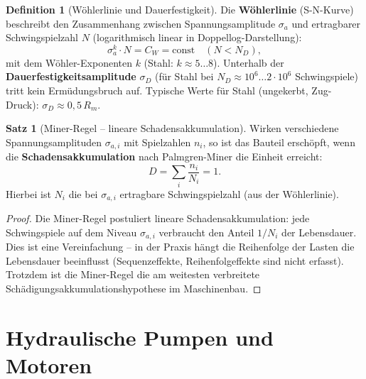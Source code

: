 ﻿\documentclass[a4paper,12pt]{report}
\theoremstyle{definition}
\newtheorem{definition}{Definition}
\newtheorem{satz}{Satz}
\begin{document}
\begin{definition}[Wöhlerlinie und Dauerfestigkeit]
Die \textbf{Wöhlerlinie} (S-N-Kurve) beschreibt den Zusammenhang zwischen
Spannungsamplitude $\sigma_a$ und ertragbarer Schwingspielzahl $N$
(logarithmisch linear in Doppellog-Darstellung):
\[
  \sigma_a^k \cdot N = C_W = \mathrm{const} \quad (N < N_D),
\]
mit dem Wöhler-Exponenten $k$ (Stahl: $k \approx 5\ldots8$).
Unterhalb der \textbf{Dauerfestigkeitsamplitude} $\sigma_D$ (für Stahl
bei $N_D \approx 10^6\ldots2\cdot10^6$ Schwingspiele) tritt kein Ermüdungsbruch auf.
Typische Werte für Stahl (ungekerbt, Zug-Druck): $\sigma_D \approx 0{,}5\,R_m$.
\end{definition}

\begin{satz}[Miner-Regel -- lineare Schadensakkumulation]
Wirken verschiedene Spannungsamplituden $\sigma_{a,i}$ mit Spielzahlen $n_i$,
so ist das Bauteil erschöpft, wenn die \textbf{Schadensakkumulation}
nach Palmgren-Miner die Einheit erreicht:
\[
  D = \sum_{i}\frac{n_i}{N_{i}} = 1.
\]
Hierbei ist $N_i$ die bei $\sigma_{a,i}$ ertragbare Schwingspielzahl
(aus der Wöhlerlinie).
\end{satz}
\begin{proof}
Die Miner-Regel postuliert lineare Schadensakkumulation: jede Schwingspiele
auf dem Niveau $\sigma_{a,i}$ verbraucht den Anteil $1/N_i$ der Lebensdauer.
Dies ist eine Vereinfachung -- in der Praxis hängt die Reihenfolge der Lasten
die Lebensdauer beeinflusst (Sequenzeffekte, Reihenfolgeffekte sind nicht erfasst).
Trotzdem ist die Miner-Regel die am weitesten verbreitete
Schädigungsakkumulationshypothese im Maschinenbau.
\end{proof}


\section{Hydraulische Pumpen und Motoren}
\end{document}
